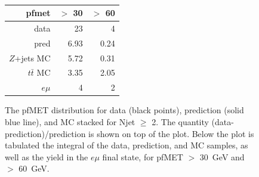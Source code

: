 \begin{figure}[hbtp]
  \begin{center}
	\\ \medskip 
    \begin{tabular}{r|r|r}
      pfmet          & $>$ 30 & $>$ 60 \\ \hline
      data           &     23 &      4 \\
      pred           &   6.93 &   0.24 \\
      $Z$+jets MC    &   5.72 &   0.31 \\
      $t\bar{t}$ MC  &   3.35 &   2.05 \\
      $e\mu$         &      4 &      2  \\
   \end{tabular}
    \caption{The pfMET distribution for data (black points), prediction (solid blue line), and MC stacked for Njet $\ge$ 2. 
      The quantity (data-prediction)/prediction is shown on top of the plot.
      Below the plot is tabulated the integral of the data, prediction, and MC samples, as well as the yield in the $e\mu$
      final state, for pfMET $>$ 30~GeV and $>$ 60~GeV.
    }
    \label{fig:pfpredge2}
  \end{center}
\end{figure}

